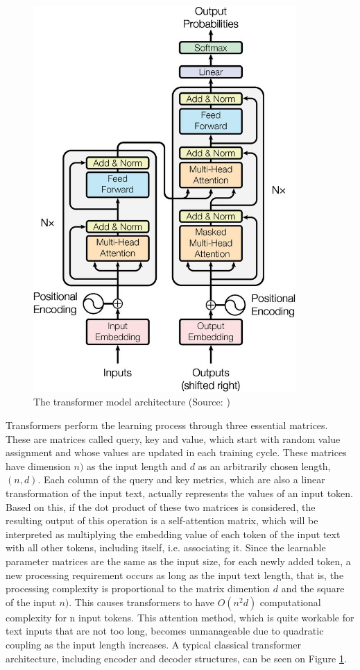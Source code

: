 \documentclass{iyte}
\begin{document}
\begin{figure}[ht]
\centering
\includegraphics[width=10cm]{images/transformer_model_arc.jpg}
\caption{The transformer model architecture (Source: \cite{attention_is_all_you_need})}
\label{fig:transfomer_arc}
\end{figure}

Transformers perform the learning process through three essential matrices. These are matrices called query, key and value, which start with random value assignment and whose values are updated in each training cycle. These matrices have dimension \(n)\) as the input length and \(d\) as an arbitrarily chosen length, \((n,d)\). Each column of the query and key metrics, which are also a linear transformation of the input text, actually represents the values of an input token. Based on this, if the dot product of these two matrices is considered, the resulting output of this operation is a self-attention matrix, which will be interpreted as multiplying the embedding value of each token of the input text with all other tokens, including itself, i.e. associating it. Since the learnable parameter matrices are the same as the input size, for each newly added token, a new processing requirement occurs as long as the input text length, that is, the processing complexity is proportional to the matrix dimention \(d\) and the square of the input \(n)\). This causes transformers to have \(O(n^2d)\) computational complexity for n input tokens. This attention method, which is quite workable for text inputs that are not too long, becomes unmanageable due to quadratic coupling as the input length increases. A typical classical transformer architecture, including encoder and decoder structures, can be seen on Figure \ref{fig:transfomer_arc}.
\end{document}
